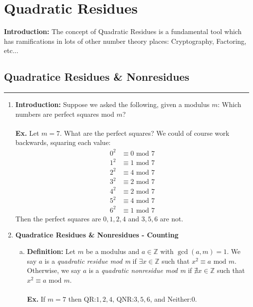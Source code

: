 \documentclass[class=article, crop=false]{standalone}
\def\integers{{\mathbb Z}}
\begin{document}
\setcounter{section}{10}
\section{Quadratic Residues}
\textbf{Introduction:} The concept of Quadratic Residues is a fundamental tool
which has ramifications in lots of other number theory places: Cryptography, Factoring,
etc...
\subsection{Quadratice Residues \& Nonresidues}
\rule{\textwidth}{1pt}
\begin{enumerate}[1.]
\item \textbf{Introduction:} Suppose we asked the following, given a modulus $m$:
Which numbers are perfect squares mod $m$? \\\\
\textbf{Ex.} Let $m=7$. What are the perfect squares? We could of course work backwards,
squaring each value:
\begin{align*}
	0^2 &\equiv 0\mbox{ mod } 7 \\
	1^2 &\equiv 1\mbox{ mod } 7 \\
	2^2 &\equiv 4\mbox{ mod } 7 \\
	3^2 &\equiv 2\mbox{ mod } 7 \\
	4^2 &\equiv 2\mbox{ mod } 7 \\
	5^2 &\equiv 4\mbox{ mod } 7 \\
	6^2 &\equiv 1\mbox{ mod } 7
\end{align*}
Then the perfect squares are $0,1,2,4$ and $3,5,6$ are not.

\item \textbf{Quadratice Residues \& Nonresidues - Counting}
\begin{enumerate}[(a)]
	\item \textbf{Definition:} Let $m$ be a modulus and $a\in\integers$ with $\gcd(a,m)=1$.
	We say $a$ is a \textit{quadratic residue mod m} if $\exists x\in\integers$ such that 
	$x^2 \equiv a\mbox{ mod } m$. Otherwise, we say $a$ is a \textit{quadratic nonresidue mod m}
	if $\nexists x\in\integers$ such that $x^2 \equiv a\mbox{ mod } m$. \\\\
	\textbf{Ex.} If $m=7$ then QR:$1,2,4$, QNR:$3,5,6$, and Neither:$0$.
	

\end{enumerate}
\end{enumerate}
\end{document}
